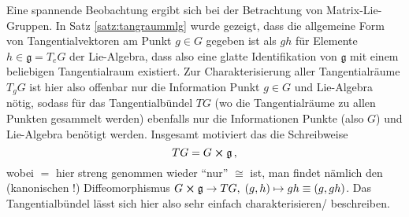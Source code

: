 \documentclass[../H_Analysis_main.tex]{subfiles}
\begin{document}
\begin{bsp}
Eine spannende Beobachtung ergibt sich bei der Betrachtung von Matrix-Lie-Gruppen. In Satz \ref{satz:tangraummlg} wurde gezeigt, dass die allgemeine Form von Tangentialvektoren am Punkt $g \in G$ gegeben ist als $g h$ für Elemente $h \in \mathfrak{g} = T_e G$ der Lie-Algebra, dass also eine glatte  Identifikation von $\mathfrak{g}$ mit einem beliebigen Tangentialraum existiert. Zur Charakterisierung aller Tangentialräume $T_g G$ ist hier also offenbar nur die Information Punkt $g \in G$ und Lie-Algebra nötig, sodass für das Tangentialbündel $TG$ (wo die Tangentialräume zu allen Punkten gesammelt werden) ebenfalls nur die Informationen Punkte (also $G$) und Lie-Algebra benötigt werden. Insgesamt motiviert das die Schreibweise
\begin{equation}
TG = G \cross \mathfrak{g} \, ,
\end{equation}
wobei $=$ hier streng genommen wieder \enquote{nur} $\cong$ ist, man findet nämlich den (kanonischen !) Diffeomorphismus $G \cross \mathfrak{g} \rightarrow TG, \; (g, h) \mapsto gh \equiv (g, g h)$. Das Tangentialbündel lässt sich hier also sehr einfach charakterisieren/ beschreiben.
\end{bsp}
\end{document}
